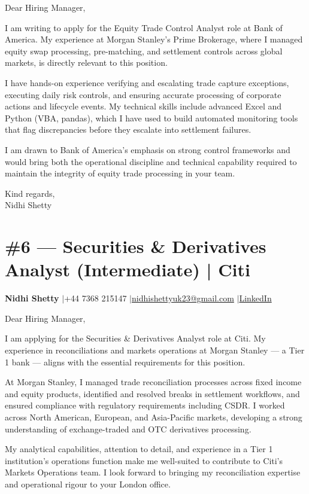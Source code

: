 \documentclass[11pt,a4paper]{article}
\makeatletter
\newcommand{\coverheader}{%
\begin{flushleft}
{\bfseries Nidhi Shetty} \enspace$\vert$\enspace +44 7368 215147 \enspace$\vert$\enspace \href{mailto:nidhishettyuk23@gmail.com}{nidhishettyuk23@gmail.com} \enspace$\vert$\enspace \href{https://www.linkedin.com/in/nidhi-shetty23-1841b7181}{LinkedIn}
\end{flushleft}
\vspace{4pt}
}
\makeatother
\begin{document}
Dear Hiring Manager,

I am writing to apply for the Equity Trade Control Analyst role at Bank of America. My experience at Morgan Stanley's Prime Brokerage, where I managed equity swap processing, pre-matching, and settlement controls across global markets, is directly relevant to this position.

I have hands-on experience verifying and escalating trade capture exceptions, executing daily risk controls, and ensuring accurate processing of corporate actions and lifecycle events. My technical skills include advanced Excel and Python (VBA, pandas), which I have used to build automated monitoring tools that flag discrepancies before they escalate into settlement failures.

I am drawn to Bank of America's emphasis on strong control frameworks and would bring both the operational discipline and technical capability required to maintain the integrity of equity trade processing in your team.

\vspace{8pt}
Kind regards,\\
Nidhi Shetty

\newpage
\section{\#6 --- Securities \& Derivatives Analyst (Intermediate) | Citi}
\coverheader

Dear Hiring Manager,

I am applying for the Securities \& Derivatives Analyst role at Citi. My experience in reconciliations and markets operations at Morgan Stanley --- a Tier 1 bank --- aligns with the essential requirements for this position.

At Morgan Stanley, I managed trade reconciliation processes across fixed income and equity products, identified and resolved breaks in settlement workflows, and ensured compliance with regulatory requirements including CSDR. I worked across North American, European, and Asia-Pacific markets, developing a strong understanding of exchange-traded and OTC derivatives processing.

My analytical capabilities, attention to detail, and experience in a Tier 1 institution's operations function make me well-suited to contribute to Citi's Markets Operations team. I look forward to bringing my reconciliation expertise and operational rigour to your London office.
\end{document}
